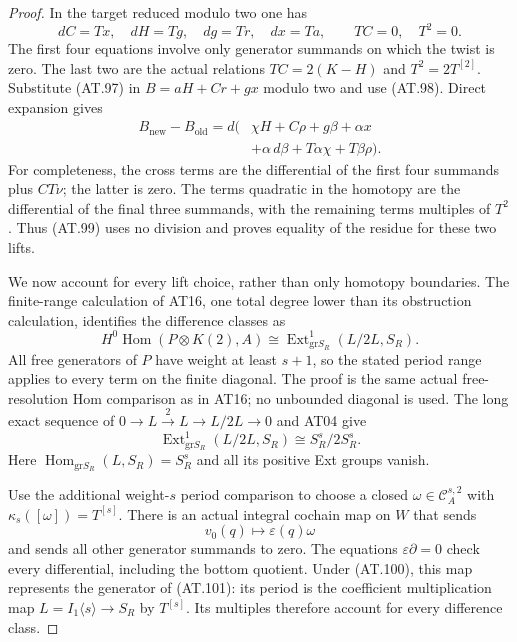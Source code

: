 \begin{proof}
In the target reduced modulo two one has
\[
 dC=Tx,\quad dH=Tg,\quad dg=Tr,\quad dx=Ta,\qquad
 TC=0,\quad T^2=0.
 \tag{AT.98}
\]
The first four equations involve only generator summands on
which the twist is zero. The last two are the actual relations
$TC=2(K-H)$ and $T^2=2T^{[2]}$.
Substitute (AT.97) in $B=aH+Cr+gx$ modulo two and use
(AT.98). Direct expansion gives
\[
 \begin{split}
 B_{\mathrm{new}}-B_{\mathrm{old}}
   =d\bigl(&\chi H+C\rho+g\beta+\alpha x\\
            &+\alpha\,d\beta+T\alpha\chi+T\beta\rho\bigr).
 \end{split}                                                     \tag{AT.99}
\]
For completeness, the cross terms are the differential of
the first four summands plus $CT\nu$; the latter is zero.
The terms quadratic in the homotopy are the differential
of the final three summands, with the remaining terms
multiples of $T^2$. Thus (AT.99) uses no division and proves
equality of the residue for these two lifts.

We now account for every lift choice, rather than only
homotopy boundaries. The finite-range calculation of AT16,
one total degree lower than its obstruction calculation,
identifies the difference classes as
\[
 H^0\operatorname{Hom}(P\otimes K(2),A)
       \cong \operatorname{Ext}^1_{\mathrm{gr}S_R}(L/2L,S_R).
 \tag{AT.100}
\]
All free generators of $P$ have weight at least $s+1$,
so the stated period range applies to every term on the
finite diagonal. The proof is the same actual free-resolution
Hom comparison as in AT16; no unbounded diagonal is used.
The long exact sequence of
$0\to L\xrightarrow{\,2\,}L\to L/2L\to0$ and AT04 give
\[
 \operatorname{Ext}^1_{\mathrm{gr}S_R}(L/2L,S_R)
       \cong S_R^s/2S_R^s.
 \tag{AT.101}
\]
Here $\operatorname{Hom}_{\mathrm{gr}S_R}(L,S_R)=S_R^s$
and all its positive Ext groups vanish.

Use the additional weight-$s$ period comparison to choose
a closed $\omega\in\mathcal C_A^{s,2}$ with
$\kappa_s([\omega])=T^{[s]}$.
There is an actual integral cochain map on $W$ that sends
\[
 v_0(q)\longmapsto \varepsilon(q)\omega
 \tag{AT.102}
\]
and sends all other generator summands to zero.
The equations $\varepsilon\partial=0$ check every
differential, including the bottom quotient. Under (AT.100),
this map represents the generator of (AT.101): its period
is the coefficient multiplication map
$L=I_1\langle s\rangle\to S_R$ by $T^{[s]}$.
Its multiples therefore account for every difference class.


\end{proof}
